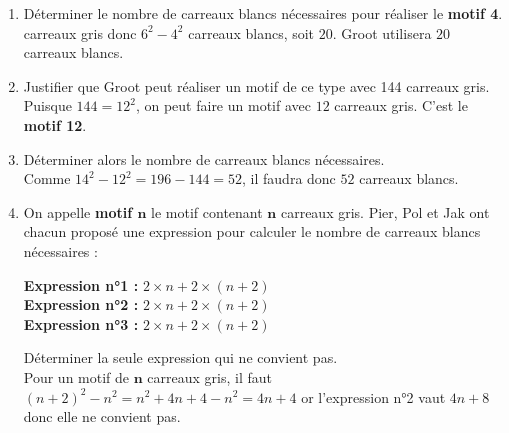 \begin{corrige}
    \begin{enumerate}
        \item Déterminer le nombre de carreaux blancs nécessaires pour réaliser le {\bfseries motif 4}.\\
        { carreaux gris donc $6^2-4^2$ carreaux blancs, soit $20$. Groot utilisera $20$ carreaux blancs.}
        \item Justifier que Groot peut réaliser un motif de ce type avec \num{144} carreaux gris.\\
        Puisque $144=12^2$, on peut faire un motif avec $12$ carreaux gris. C'est le {\bfseries motif 12}.
        \item Déterminer alors le nombre de carreaux blancs nécessaires.\\
        {\red Comme $14^2-12^2=196-144=52$, il faudra donc $52$ carreaux blancs.}
        \item On appelle {\bfseries motif $\boldsymbol{n}$} le motif contenant {\bfseries $\boldsymbol{n}$} carreaux gris. Pier, Pol et Jak ont chacun proposé une expression
        pour calculer le nombre de carreaux blancs nécessaires :\\
        \begin{itemize}
            \def\item{}
            \item {\bfseries Expression n°1 : }$2\times n + 2\times(n+2)$\\
            \item {\bfseries Expression n°2 : }$2\times n + 2\times(n+2)$\\
            \item {\bfseries Expression n°3 : }$2\times n + 2\times(n+2)$\\
        \end{itemize}
        Déterminer la seule expression qui ne convient pas.\\
        {\red Pour un motif de {\bfseries $\boldsymbol{n}$} carreaux gris, il faut $(n+2)^2-n^2=n^2+4n+4-n^2=4n+4$ or l'expression n°2 vaut $4n+8$ donc elle ne convient pas.}
    \end{enumerate}
\end{corrige}
